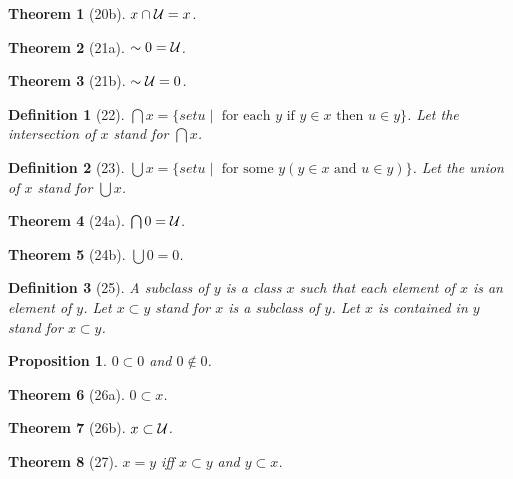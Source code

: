 \documentclass{scrartcl}
\newenvironment{forthel}{\begin{leftbar}}{\end{leftbar}}
\newtheorem*{theorem}{Theorem}
\newtheorem*{definition}{Definition}
\newtheorem*{proposition}{Proposition}
\begin{document}
\begin{forthel}
\begin{theorem}[20b] $x \cap {\cal U} = x$.
\end{theorem}

\begin{theorem}[21a] $\sim 0 = {\cal U}$.
\end{theorem}

\begin{theorem}[21b] $\sim {\cal U} = 0$.
\end{theorem}

\begin{definition}[22] $\bigcap x = 
\{set u \mid \text{ for each } y \text{ if } y \in x \text{ then } u \in y\}$.
Let the \emph{intersection} of $x$ stand for $\bigcap x$.
\end{definition}

\begin{definition}[23] $\bigcup x = 
\{set u \mid \text{ for some } y (y \in x \text{ and } u \in y)\}$.
Let the \emph{union} of $x$ stand for $\bigcup x$.
\end{definition}

\begin{theorem}[24a] $\bigcap 0 = {\cal U}$.
\end{theorem}

\begin{theorem}[24b] $\bigcup 0 = 0$.
\end{theorem}

\begin{definition}[25] 
A \emph{subclass} of $y$ is a class $x$ such that each element of $x$ is an
element of $y$. Let $x \subset y$ stand for $x$ is a subclass of $y$.
Let $x$ is \emph{contained} in $y$ stand for $x \subset y$.
\end{definition}


\begin{proposition} $0 \subset 0$ and $0 \notin 0$.
\end{proposition}

\begin{theorem}[26a] $0 \subset x$.
\end{theorem}

\begin{theorem}[26b] $x \subset {\cal U}$.
\end{theorem}

\begin{theorem}[27] $x = y$ iff $x \subset y$ and $y \subset x$.
\end{theorem}


\end{forthel}
\end{document}
